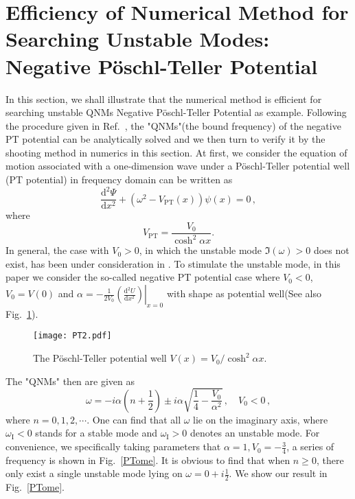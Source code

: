 \documentclass[pr, twocolumn, preprintnumbers, showpacs,footnoteadded, superscriptaddress,nofootinbib,longbibliography]{revtex4-1}
\newcommand{\td}{\mathrm{d}}
\begin{document}
\section{Efficiency of Numerical Method for Searching Unstable Modes: Negative P\"{o}schl-Teller Potential }\label{PT}
In this section, we shall illustrate that the numerical method is efficient for searching unstable QNMs Negative P\"{o}schl-Teller Potential as example. Following the procedure given in Ref.~\cite{Ferrari:1984zz}, the "QNMs"(the bound frequency) of the negative PT potential can be analytically solved and we then turn to verify it by the shooting method in numerics in this section. At first, we consider the equation of motion associated with a one-dimension wave under a P\"{o}schl-Teller potential well (PT potential) in frequency domain can be written as
%
\begin{equation}\label{eqPT}
\frac{\td^2 \Psi}{\td x^2}+(\omega^2-V_{\text{PT}}(x))\psi(x)=0\, ,
\end{equation}
%
where
%
\begin{equation}\label{VPT}
V_{\text{PT}}=\frac{V_0}{\cosh^2 \alpha x}.
\end{equation}
%
In general, the case with $V_0 >0$, in which the unstable mode $\Im(\omega)>0$ does not exist, has been under consideration in \cite{Ferrari:1984zz}. To stimulate the unstable mode, in this paper we consider the so-called negative PT potential case where $V_0<0$, $V_0=V(0)$ and $\alpha=\left.-\frac{1}{2V_0}\left(\frac{\td^2 U}{\td x^2} \right)\right|_{x=0}$ with shape as potential well(See also Fig.~\ref{PTp}).
%
\begin{figure}[h]
  \centering
  \texttt{[image: PT2.pdf]}
  \caption{The P\"{o}schl-Teller potential well $V(x)=V_0/\cosh^2 \alpha x$.}\label{PTp}
\end{figure}
%
The "QNMs" then are given as
%
\begin{equation}
\omega=-i \alpha \left(n+\frac{1}{2} \right) \pm i \alpha \sqrt{\frac{1}{4}-\frac{V_0}{\alpha^2}} \, , \quad V_0 <0 \, ,
\end{equation}
%
where $n=0, 1, 2, \cdots$. One can find that all $\omega$ lie on the imaginary axis, where $\omega_{\text{I}}<0$ stands for a stable mode and $\omega_{\text{I}}>0$ denotes an unstable mode. For convenience, we specifically taking parameters that $\alpha=1, V_0=-\frac{3}{4}$, a series of frequency is shown in Fig.~\ref{PTome}. It is obvious to find that when $n\geq 0$, there only exist a single unstable mode lying on $\omega=0+i\frac{1}{2}$. We show our result in Fig.~\ref{PTome}.
\end{document}
